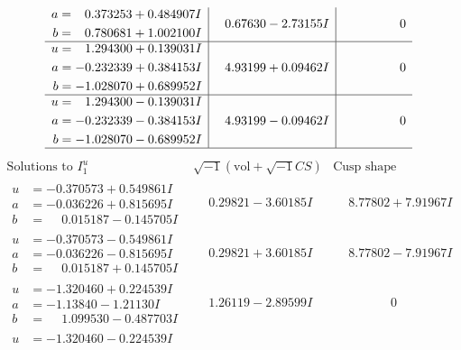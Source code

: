\documentclass[1p]{elsarticle_modified}
\theoremstyle{definition}
\newcommand{\I}{\sqrt{-1}}
\begin{document}
$$\begin{array}{c|c|c}
\begin{aligned}
a &= \phantom{-}0.373253 + 0.484907 I \\
b &= \phantom{-}0.780681 + 1.002100 I\end{aligned}
 & \phantom{-}0.67630 - 2.73155 I & \phantom{-0.000000 } 0 \\ \hline\begin{aligned}
u &= \phantom{-}1.294300 + 0.139031 I \\
a &= -0.232339 + 0.384153 I \\
b &= -1.028070 + 0.689952 I\end{aligned}
 & \phantom{-}4.93199 + 0.09462 I & \phantom{-0.000000 } 0 \\ \hline\begin{aligned}
u &= \phantom{-}1.294300 - 0.139031 I \\
a &= -0.232339 - 0.384153 I \\
b &= -1.028070 - 0.689952 I\end{aligned}
 & \phantom{-}4.93199 - 0.09462 I & \phantom{-0.000000 } 0\\
 \hline 
 \end{array}$$\newpage$$\begin{array}{c|c|c}  
\text{Solutions to }I^u_{1}& \I (\text{vol} + \sqrt{-1}CS) & \text{Cusp shape}\\
 \hline 
\begin{aligned}
u &= -0.370573 + 0.549861 I \\
a &= -0.036226 + 0.815695 I \\
b &= \phantom{-}0.015187 - 0.145705 I\end{aligned}
 & \phantom{-}0.29821 - 3.60185 I & \phantom{-}8.77802 + 7.91967 I \\ \hline\begin{aligned}
u &= -0.370573 - 0.549861 I \\
a &= -0.036226 - 0.815695 I \\
b &= \phantom{-}0.015187 + 0.145705 I\end{aligned}
 & \phantom{-}0.29821 + 3.60185 I & \phantom{-}8.77802 - 7.91967 I \\ \hline\begin{aligned}
u &= -1.320460 + 0.224539 I \\
a &= -1.13840 - 1.21130 I \\
b &= \phantom{-}1.099530 - 0.487703 I\end{aligned}
 & \phantom{-}1.26119 - 2.89599 I & \phantom{-0.000000 } 0 \\ \hline\begin{aligned}
u &= -1.320460 - 0.224539 I \\

\end{aligned}
\end{array}$$
\end{document}
